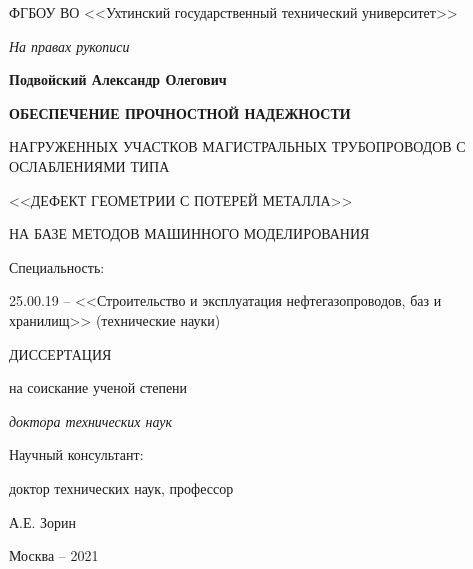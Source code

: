 \thispagestyle{empty}%
	\begin{center}
		ФГБОУ ВО <<Ухтинский государственный технический университет>>
	\end{center}
	\vspace{\baselineskip}\vspace{-5mm}

	\begin{flushright}
		\itshape
		На правах рукописи
	\end{flushright}
	\vspace{\baselineskip}\vspace{-3mm}
	
	\begin{center}
		\textbf{Подвойский Александр Олегович}
	\end{center}
	\vspace{5mm}
	
	\begin{center}
		\bfseries
			ОБЕСПЕЧЕНИЕ ПРОЧНОСТНОЙ НАДЕЖНОСТИ
			
			НАГРУЖЕННЫХ УЧАСТКОВ МАГИСТРАЛЬНЫХ ТРУБОПРОВОДОВ С ОСЛАБЛЕНИЯМИ ТИПА 
			
			<<ДЕФЕКТ ГЕОМЕТРИИ С ПОТЕРЕЙ МЕТАЛЛА>>
			
			НА БАЗЕ МЕТОДОВ МАШИННОГО МОДЕЛИРОВАНИЯ
	\end{center}
	\vspace{\baselineskip}\vspace{-9mm}
	
	\begin{center}
		Специальность:
		
		25.00.19 -- <<Строительство и эксплуатация нефтегазопроводов, баз и хранилищ>> (технические науки)
	\end{center}
	\vspace{\baselineskip}\vspace{-8mm}

	\begin{center}
		ДИССЕРТАЦИЯ
		
		на соискание ученой степени
		
		\emph{доктора технических наук}
	\end{center}
	\vspace{\baselineskip}\vspace{5mm}

	\begin{flushright}
		Научный консультант:
		
		доктор технических наук, профессор
		
		А.Е. Зорин
	\end{flushright}

	\vfill
	\begin{center}
		Москва -- 2021
	\end{center}
\newpage
